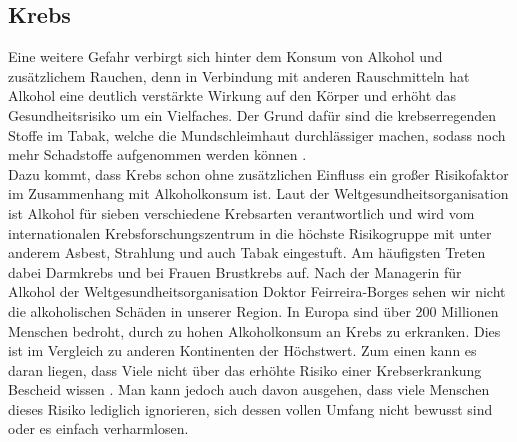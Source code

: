 \documentclass[12pt]{article}
\begin{document}
\subsection{Krebs}                                                                                                                
Eine weitere Gefahr verbirgt sich hinter dem Konsum von Alkohol und zusätzlichem Rauchen, denn in Verbindung mit anderen Rauschmitteln hat Alkohol eine deutlich verstärkte Wirkung auf den Körper und erhöht das Gesundheitsrisiko um ein Vielfaches. Der Grund dafür sind die krebserregenden Stoffe im Tabak, welche die Mundschleimhaut durchlässiger machen, sodass noch mehr Schadstoffe aufgenommen werden können \autocite{seufferlein_alkoholkonsum_2022}. \\
Dazu kommt, dass Krebs schon ohne zusätzlichen Einfluss ein großer Risikofaktor im Zusammenhang mit Alkoholkonsum ist. Laut der Weltgesundheitsorganisation ist Alkohol für sieben verschiedene Krebsarten verantwortlich und wird vom internationalen Krebsforschungszentrum in die höchste Risikogruppe mit unter anderem Asbest, Strahlung und auch Tabak eingestuft. Am häufigsten Treten dabei Darmkrebs und bei Frauen Brustkrebs auf. Nach der Managerin für Alkohol der Weltgesundheitsorganisation Doktor Feirreira-Borges sehen wir nicht die alkoholischen Schäden in unserer Region. In Europa sind über 200 Millionen Menschen bedroht, durch zu hohen Alkoholkonsum an Krebs zu erkranken. Dies ist im Vergleich zu anderen Kontinenten der Höchstwert. Zum einen kann es daran liegen, dass Viele nicht über das erhöhte Risiko einer Krebserkrankung Bescheid wissen \autocite{noauthor_beim_nodate}. Man kann jedoch auch davon ausgehen, dass viele Menschen dieses Risiko lediglich ignorieren, sich dessen vollen Umfang nicht bewusst sind oder es einfach verharmlosen. \\
\end{document}

